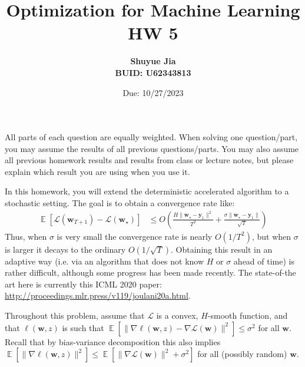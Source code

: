 \documentclass[letterpaper]{article}
\title{Optimization for Machine Learning HW 5}
\author{\textbf{Shuyue Jia} \\ \textbf{BUID: U62343813}}
\date{Due: 10/27/2023}
\newcommand{\E}{\mathop{\mathbb{E}}}
\renewcommand{\L}{\mathcal{L}}
\newcommand{\by}{\mathbf{y}}
\newcommand{\bw}{\mathbf{w}}
\begin{document}
\maketitle
All parts of each question are equally weighted. When solving one question/part, you may assume the results of all previous questions/parts. You may also assume all previous homework results and results from class or lecture notes, but please explain which result you are using when you use it.

In this homework, you will extend the deterministic accelerated algorithm to a stochastic setting. The goal is to obtain a convergence rate like:
\begin{align*}
    \E\left[\L(\bw_{T+1})-\L(\bw_\star)\right]&\le O\left(\frac{H \|\bw_\star - \by_1\|^2}{T^2} + \frac{\sigma \|\bw_\star - \by_1\|}{\sqrt{T}}\right)
\end{align*}
Thus, when $\sigma$ is very small the convergence rate is nearly $O(1/T^2)$, but when $\sigma$ is larger it decays to the ordinary $O(1/\sqrt{T})$. Obtaining this result in an adaptive way (i.e. via an algorithm that does not know $H$ or $\sigma$ ahead of time) is rather difficult, although some progress has been made recently. The state-of-the art here is currently this ICML 2020 paper: \url{http://proceedings.mlr.press/v119/joulani20a.html}.

Throughout this problem, assume that $\L$ is a convex, $H$-smooth function, and that $\ell(\bw ,z)$ is such that $\E[\|\nabla \ell(\bw,z)-\nabla \L(\bw)\|^2]\le \sigma^2$ for all $\bw$. Recall that by bias-variance decomposition this also implies $\E[\|\nabla\ell(\bw,z)\|^2]\le \E[\|\nabla \L(\bw)\|^2+\sigma^2]$ for all (possibly random) $\bw$.
\end{document}
